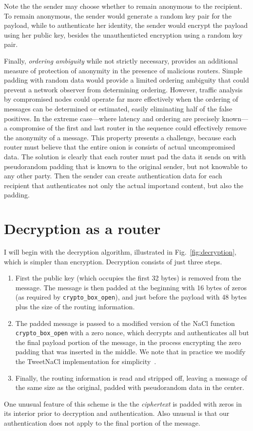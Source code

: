 \documentclass[letterpaper,twocolumn,amsmath,amssymb,pre,aps,10pt]{revtex4-1}
\begin{document}
Note the the sender may choose whether to remain anonymous to the
recipient.  To remain anonymous, the sender would generate a random
key pair for the payload, while to authenticate her identity, the
sender would encrypt the payload using her public key, besides the
unauthenticted encryption using a random key pair.

Finally, \emph{ordering ambiguity} while not strictly necessary,
provides an additional measure of protection of anonymity in the
presence of malicious routers.  Simple padding with random data would
provide a limited ordering ambiguity that could prevent a network
observer from determining ordering.  However, traffic analysis by
compromised nodes could operate far more effectively when the ordering
of messages can be determined or estimated, easily eliminating half of
the false positives.  In the extreme case---where latency and ordering
are precisely known---a compromise of the first and last router in the
sequence could effectively remove the anonymity of a message.  This
property presents a challenge, because each router must believe that
the entire onion is consists of actual uncompromised data.  The
solution is clearly that each router must pad the data it sends on
with pseudorandom padding that is known to the original sender, but
not knowable to any other party.  Then the sender can create
authentication data for each recipient that authenticates not only the
actual importand content, but also the padding.

\section{Decryption as a router}

I will begin with the decryption algorithm, illustrated in
Fig.~\ref{fig:decryption}, which is simpler than encryption.
Decryption consists of just three steps.
\begin{enumerate}
\item First the public key (which occupies the first 32 bytes) is
  removed from the message.  The message is then padded at the
  beginning with 16 bytes of zeros (as required by
  \verb!crypto_box_open!), and just before the payload with 48 bytes
  plus the size of the routing information.
\item The padded message is passed to a modified version of the NaCl
  function \verb!crypto_box_open! with a zero nonce, which decrypts
  and authenticates all but the final payload portion of the message,
  in the process encrypting the zero padding that was inserted in the
  middle.  We note that in practice we modify the TweetNaCl
  implementation for simplicity~\cite{bernstein2014tweetnacl}.
\item Finally, the routing information is read and stripped off,
  leaving a message of the same size as the original, padded with
  pseudorandom data in the center.
\end{enumerate}
One unusual feature of this scheme is the the \emph{ciphertext} is
padded with zeros in its interior prior to decryption and
authentication.  Also unusual is that our authentication does not
apply to the final portion of the message.
\end{document}
